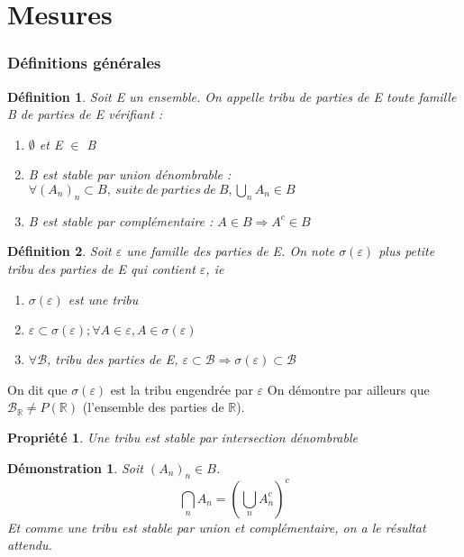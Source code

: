 \documentclass{article}
\theoremstyle{mes_theoremes}
\newtheorem*{Def}{Définition}
\newtheorem{prop}{Propriété}[section]
\newtheorem*{dem}{Démonstration}
\begin{document}
\part{Mesures}
\section{Définitions générales}
\begin{Def}
Soit E un ensemble. On appelle tribu de parties de E toute famille B de parties de E vérifiant :
\begin{enumerate}
\item $\emptyset$ et E $\in$ B
\item B est stable par union dénombrable : $\forall (A_n)_n \subset B,\ suite\ de\ parties\ de\ B, \bigcup_n A_n \in B$
\item B est stable par complémentaire : $A\in B \Rightarrow A^c \in B$
\end{enumerate}
\end{Def}

\bigskip
\begin{Def}
Soit $\varepsilon$ une famille des parties de E.
On note $\sigma(\varepsilon)$ plus petite tribu des parties de E qui contient $\varepsilon$, ie
\begin{enumerate}
\item $\sigma(\varepsilon)$ est une tribu
\item $\varepsilon \subset \sigma(\varepsilon); \forall A \in \varepsilon, A\in \sigma(\varepsilon)$
\item $\forall \mathcal{B}$, tribu des parties de E, $\varepsilon \subset \mathcal{B} \Rightarrow \sigma(\varepsilon) \subset \mathcal{B}$
\end{enumerate}
\end{Def}

On dit que $\sigma(\varepsilon)$ est la tribu engendrée par $\varepsilon$
On démontre par ailleurs que $\mathcal{B}_{\mathbb{R}} \neq P(\mathbb{R})$ (l'ensemble des parties de $\mathbb{R}$).

\bigskip
\begin{prop}
Une tribu est stable par intersection dénombrable
\end{prop}

\begin{dem}
Soit $(A_n)_n \in B$.
\[\bigcap_n A_n = \left( \bigcup_n A_n^c \right)^c\]
Et comme une tribu est stable par union et complémentaire, on a le résultat attendu.
\end{dem}
\end{document}
